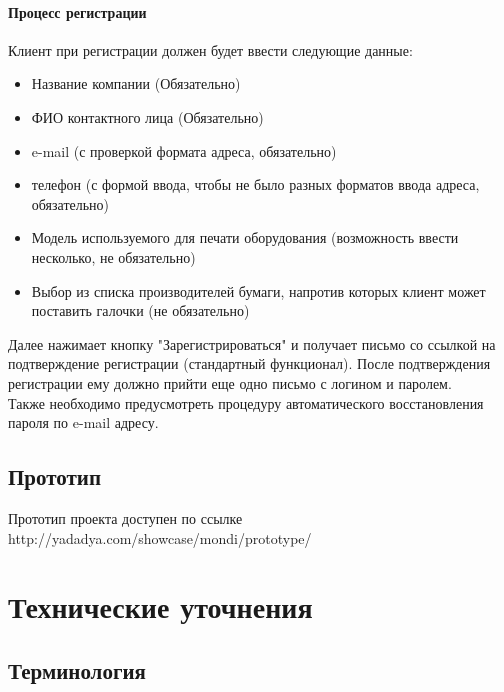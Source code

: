 \documentclass[DIV=calc, paper=a4, fontsize=11pt]{scrartcl} %
\begin{document}
\paragraph{Процесс регистрации}
Клиент при регистрации должен будет ввести следующие данные:

\begin{itemize}
	\item Название компании (Обязательно)
	\item ФИО контактного лица (Обязательно)
	\item e-mail (с проверкой формата адреса, обязательно)
	\item телефон (с формой ввода, чтобы не было разных форматов ввода адреса, обязательно)
	\item Модель используемого для печати оборудования (возможность ввести несколько, не обязательно)
	\item Выбор из списка производителей бумаги, напротив которых клиент может поставить галочки (не обязательно)
\end{itemize}

Далее нажимает кнопку "Зарегистрироваться" и получает письмо со ссылкой на подтверждение регистрации (стандартный функционал). После подтверждения регистрации ему должно прийти еще одно письмо с логином и паролем. 
\\[0.5cm] 
Также необходимо предусмотреть процедуру автоматического восстановления пароля по e-mail адресу.

\subsection{Прототип}
Прототип проекта доступен по ссылке http://yadadya.com/showcase/mondi/prototype/

\section{Технические уточнения}

\subsection{Терминология}
        
\end{document}
